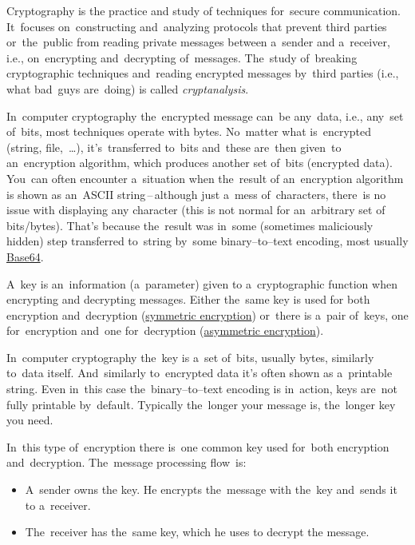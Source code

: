 Cryptography is the practice and study of techniques for~secure communication.
It~focuses on~constructing and~analyzing protocols that prevent third parties or~the~public from reading private messages between a~sender and a~receiver, i.e., on~encrypting and~decrypting of~messages.
The~study of~breaking cryptographic techniques and~reading encrypted messages by~third parties (i.e., what bad~guys are~doing) is called \textit{cryptanalysis}.

In~computer cryptography the~encrypted message can~be any~data, i.e., any~set of~bits, most techniques operate with bytes.
No~matter what is~encrypted (string, file,~\dots), it's~transferred to~bits and~these are~then given~to an~encryption algorithm, which produces another set of~bits (encrypted data).
You~can often encounter a~situation when the~result of an~encryption algorithm is shown as an~ASCII string\,--\,although just a~mess of~characters, there~is no issue with displaying any character (this is not normal for an~arbitrary set of bits/bytes).
That's because the~result was in~some (sometimes maliciously hidden) step transferred to~string by~some binary--to--text encoding, most usually \hyperref[base64]{Base64}.

A~key is an~information (a~parameter) given to a~cryptographic function when encrypting and decrypting messages.
Either the~same key is used for both encryption and~decryption (\hyperref[symmetricencryption]{symmetric encryption}) or~there is a~pair of~keys, one for~encryption and~one for~decryption (\hyperref[asymmetricencryption]{asymmetric encryption}).

In~computer cryptography the~key is a~set of~bits, usually bytes, similarly to~data itself.
And~similarly to~encrypted data it's often shown as a~printable string.
Even in~this case the~binary--to--text encoding is in~action, keys are~not fully printable by~default.
Typically the~longer your message is, the~longer key you need.

\label{symmetricencryption}
In~this type of~encryption there is~one common key used for~both encryption and~decryption.
The~message processing flow~is:
\begin{itemize}
    \item A~sender owns the key.
          He encrypts the~message with the~key and~sends it to a~receiver.
    \item The~receiver has the~same key, which he uses to decrypt the message.
\end{itemize}

